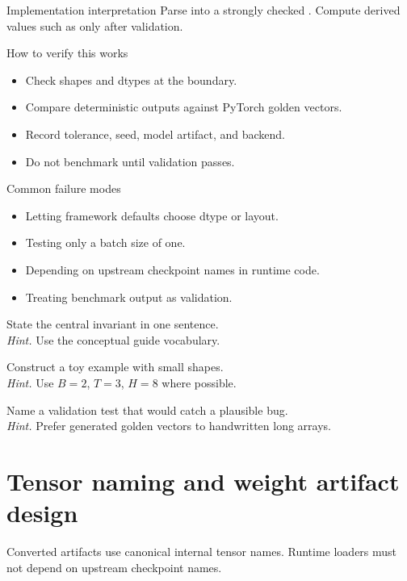 \begin{implementationbox}{Implementation interpretation}
Parse into a strongly checked . Compute derived values such as  only after validation.
\end{implementationbox}

\begin{verificationbox}{How to verify this works}
\begin{itemize}
\item Check shapes and dtypes at the boundary.
\item Compare deterministic outputs against PyTorch golden vectors.
\item Record tolerance, seed, model artifact, and backend.
\item Do not benchmark until validation passes.
\end{itemize}
\end{verificationbox}

\begin{warningbox}{Common failure modes}
\begin{itemize}
\item Letting framework defaults choose dtype or layout.
\item Testing only a batch size of one.
\item Depending on upstream checkpoint names in runtime code.
\item Treating benchmark output as validation.
\end{itemize}
\end{warningbox}

\begin{chapterexercises}
\item State the central invariant in one sentence.\\
\textit{Hint.} Use the conceptual guide vocabulary.
\item Construct a toy example with small shapes.\\
\textit{Hint.} Use $B=2$, $T=3$, $H=8$ where possible.
\item Name a validation test that would catch a plausible bug.\\
\textit{Hint.} Prefer generated golden vectors to handwritten long arrays.
\end{chapterexercises}

\chapter{Tensor naming and weight artifact design}
\label{ch:tensor-naming}
Converted artifacts use canonical internal tensor names. Runtime loaders must not depend on upstream checkpoint names.


